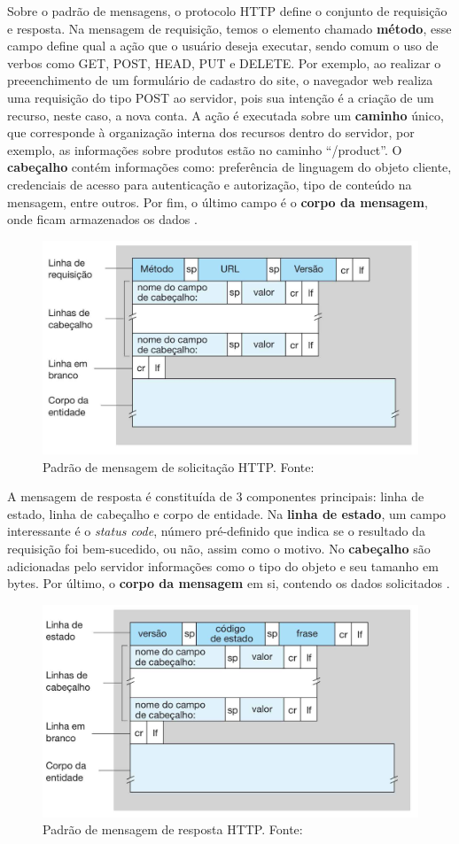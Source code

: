 Sobre o padrão de mensagens, o protocolo HTTP define o conjunto de requisição e resposta. Na mensagem de requisição, temos o elemento
chamado \textbf{método}, esse campo define qual a ação que o usuário deseja executar, sendo comum o uso de verbos
como GET, POST, HEAD, PUT e DELETE. Por exemplo, ao realizar o preeenchimento de um formulário de cadastro do site, o
navegador web realiza uma requisição do tipo POST ao servidor, pois sua intenção é a criação de um recurso,
neste caso, a nova conta. A ação é executada sobre um \textbf{caminho} único, que corresponde à organização interna dos recursos 
dentro do servidor, por exemplo, as informações sobre produtos estão no caminho ``/product''. O \textbf{cabeçalho} contém informações como: preferência de linguagem do objeto cliente,
credenciais de acesso para autenticação e autorização, tipo de conteúdo na mensagem, entre outros. Por fim, o último campo é o \textbf{corpo da mensagem}, 
onde ficam armazenados os dados \cite[pp. 77]{redeskurose2010}.

\begin{figure}[ht]
    \centering
    \includegraphics[width=.55\textwidth]{img/mensagem-http-solicitação.png}
    \caption{Padrão de mensagem de solicitação HTTP. Fonte:\cite{redeskurose2010}}\label{figMessageRequest}
\end{figure}

A mensagem de resposta é constituída de 3 componentes principais: linha de estado, linha de cabeçalho e corpo de entidade. Na \textbf{linha de estado}, um campo
interessante é o \textit{status code}, número pré-definido que indica se o resultado da requisição foi bem-sucedido, ou não, assim como o motivo. No \textbf{cabeçalho}
são adicionadas pelo servidor informações como o tipo do objeto e seu tamanho em bytes. Por último, o \textbf{corpo da mensagem} em si, contendo os dados solicitados \cite[pp. 78]{redeskurose2010}.

\begin{figure}[ht]
    \centering
    \includegraphics[width=.55\textwidth]{img/mensagem-http-resposta.png}
    \caption{Padrão de mensagem de resposta HTTP. Fonte:\cite{redeskurose2010}}\label{figMessageResponse}
\end{figure}

